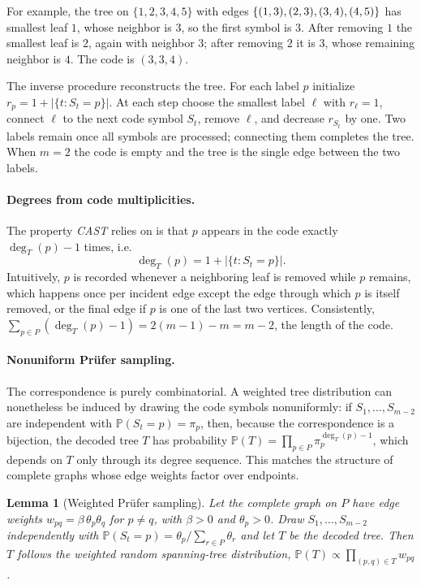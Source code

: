 \documentclass{article}
\newcommand{\CAST}{\textit{CAST}\xspace}
\newcommand{\1}{\mathbbm{1}}
\theoremstyle{plain}
\newtheorem{lemma}[theorem]{Lemma}
\renewcommand{\Pr}[1]{\mathbb{P}\left(#1\right)}
\begin{document}
For example, the tree on $\{1,2,3,4,5\}$ with edges
$\{(1,3),(2,3) \\,(3,4),(4,5)\}$ has smallest leaf $1$, whose neighbor is
$3$, so the first symbol is $3$. After removing $1$ the smallest leaf
is $2$, again with neighbor $3$; after removing $2$ it is $3$, whose
remaining neighbor is $4$. The code is $(3,3,4)$.

The inverse procedure reconstructs the tree. For each label $p$
initialize $r_p=1+\lvert\{t:S_t=p\}\rvert$. At each step choose the
smallest label $\ell$ with $r_\ell=1$, connect $\ell$ to the next code
symbol $S_t$, remove $\ell$, and decrease $r_{S_t}$ by one. Two labels
remain once all symbols are processed; connecting them completes the
tree. When $m=2$ the code is empty and the tree is the single edge
between the two labels.

\paragraph{Degrees from code multiplicities.}
The property \CAST{} relies on is that $p$ appears in the code exactly
$\deg_T(p)-1$ times, i.e.
\[
\deg_T(p) = 1+\bigl\lvert\{t:S_t=p\}\bigr\rvert .
\]
Intuitively, $p$ is recorded whenever a neighboring leaf is removed
while $p$ remains, which happens once per incident edge except the
edge through which $p$ is itself removed, or the final edge if $p$ is
one of the last two vertices. Consistently,
$\sum_{p\in P}(\deg_T(p)-1)=2(m-1)-m=m-2$, the length of the code.

\paragraph{Nonuniform Pr\"ufer sampling.}
The correspondence is purely combinatorial. A weighted tree
distribution can nonetheless be induced by drawing the code symbols
nonuniformly: if $S_1,\ldots,S_{m-2}$ are independent with
$\Pr{S_t=p}=\pi_p$, then, because the correspondence is a bijection,
the decoded tree $T$ has probability
$\Pr{T}=\prod_{p\in P}\pi_p^{\deg_T(p)-1}$, which depends on $T$ only
through its degree sequence. This matches the structure of complete
graphs whose edge weights factor over endpoints.

\begin{lemma}[Weighted Pr\"ufer sampling]
\label{lem:prufer}
Let the complete graph on $P$ have edge weights
$w_{pq}=\beta\,\theta_p\theta_q$ for $p\neq q$, with $\beta>0$ and
$\theta_p>0$. Draw $S_1,\ldots,S_{m-2}$ independently with
$\Pr{S_t=p}=\theta_p/\sum_{r\in P}\theta_r$ and let $T$ be the decoded
tree. Then $T$ follows the weighted random spanning-tree distribution,
$\Pr{T}\propto\prod_{(p,q)\in T}w_{pq}$.
\end{lemma}
\end{document}
